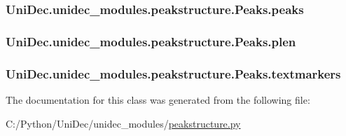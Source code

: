 \subsubsection[{peaks}]{\setlength{\rightskip}{0pt plus 5cm}Uni\+Dec.\+unidec\+\_\+modules.\+peakstructure.\+Peaks.\+peaks}\label{class_uni_dec_1_1unidec__modules_1_1peakstructure_1_1_peaks_a8d0a51ce1d4fa8c6ec1273988e665031}
\hypertarget{class_uni_dec_1_1unidec__modules_1_1peakstructure_1_1_peaks_a3a53bccc6787d4c39cf92fc7bc993de3}{}
\subsubsection[{plen}]{\setlength{\rightskip}{0pt plus 5cm}Uni\+Dec.\+unidec\+\_\+modules.\+peakstructure.\+Peaks.\+plen}\label{class_uni_dec_1_1unidec__modules_1_1peakstructure_1_1_peaks_a3a53bccc6787d4c39cf92fc7bc993de3}
\hypertarget{class_uni_dec_1_1unidec__modules_1_1peakstructure_1_1_peaks_ac5ea92f95a9439fdc932aae073c96a70}{}
\subsubsection[{textmarkers}]{\setlength{\rightskip}{0pt plus 5cm}Uni\+Dec.\+unidec\+\_\+modules.\+peakstructure.\+Peaks.\+textmarkers}\label{class_uni_dec_1_1unidec__modules_1_1peakstructure_1_1_peaks_ac5ea92f95a9439fdc932aae073c96a70}


The documentation for this class was generated from the following file\+:\begin{DoxyCompactItemize}
\item 
C\+:/\+Python/\+Uni\+Dec/unidec\+\_\+modules/\hyperlink{peakstructure_8py}{peakstructure.\+py}\end{DoxyCompactItemize}
